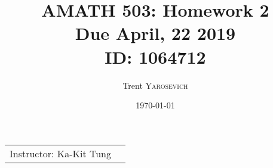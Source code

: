 \documentclass{article}
\title{AMATH 503: Homework 2 \\Due April, 22 2019 \\ ID: 1064712} %
\author{Trent \textsc{Yarosevich}} %
\date{\today} %
\begin{document}
\maketitle %
\setlength\parindent{1cm}

\begin{center}
\begin{tabular}{l r}
Instructor: Ka-Kit Tung %
\end{tabular}
\end{center}
\doublespacing

\end{document}

